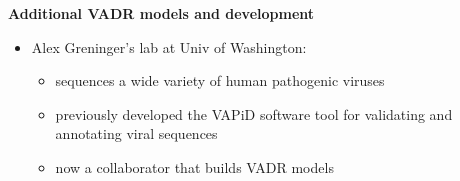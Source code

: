\documentclass[landscape]{slides}
\begin{document}
\begin{slide}
\begin{center}
  \textbf{Additional VADR models and development}
\end{center}

\begin{itemize}
  \item Alex Greninger's lab at Univ of Washington:
    \begin {itemize}
    \item sequences a wide variety of human pathogenic viruses
    \item previously developed the VAPiD software tool for validating
      and annotating viral sequences
    \item now a collaborator that builds VADR models
  \end{itemize}
\end{itemize}

  \vfill
\end{slide}
\end{document}
